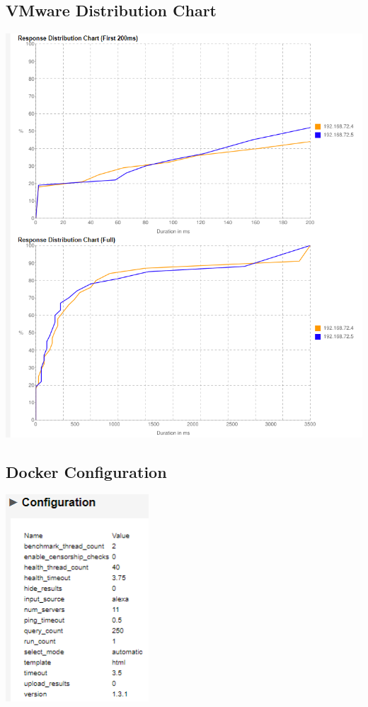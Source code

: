 \documentclass[12pt,twoside]{book}
\begin{document}
\subsection{VMware Distribution Chart}
\includegraphics[width=\textwidth]{Appendicies/VMwareTest3Chart.PNG}
\subsection{Docker Configuration}
\includegraphics[width=0.40\textwidth]{Appendicies/DockerTest3Config.PNG}
\end{document}
